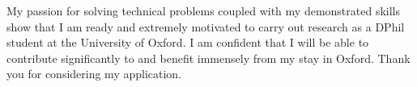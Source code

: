 \documentclass[12pt]{article}
\begin{document}
My passion for solving technical problems coupled with my demonstrated skills show that I am ready and extremely motivated to carry out research as a DPhil student at the University of Oxford. I am confident that I will be able to contribute significantly to and benefit immensely from my stay in Oxford. Thank you for considering my application.



\end{document}

